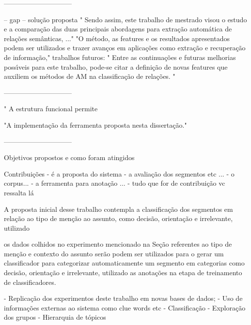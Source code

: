 ------------------------------

-- gap
-- solução proposta
	" Sendo assim, este trabalho de mestrado visou o estudo e a comparação das duas principais abordagens para extração automática de relações semânticas, ..."
	"O método, as features e os resultados apresentados podem ser utilizados e trazer avanços em aplicações como extração e recuperação de informação,"
trabalhos futuros:
	" Entre as continuações e futuras melhorias possı́veis para este trabalho, pode-se citar a definição de novas features que auxiliem os métodos de AM na classificação de relações. "


------------------------------



" A estrutura funcional permite

"A implementação da ferramenta proposta nesta dissertação."



------------------------------



Objetivos propostos e como foram atingidos





Contribuições	
	- é a proposta do sistema 
	- a avaliação dos segmentos etc ... 
	- o corpus... 
	- a ferramenta para anotação ... 
	- tudo que for de contribuição vc ressalta lá 




	A proposta inicial desse trabalho contempla a classificação dos segmentos em relação ao tipo de menção ao assunto, como decisão, orientação e irrelevante, utilizado 

	os dados colhidos no experimento mencionado na Seção referentes ao tipo de menção e contexto do assunto serão podem ser utilizados para o gerar um classificador para categorizar automaticamente um segmento em categorias como decisão, orientação e irrelevante, utilizado as anotações na etapa de treinamento de classificadores.




	- Replicação dos experimentos deste trabalho em novas bases de dados;
	- Uso de informações externas ao sistema como clue words etc
	- Classificação
	- Exploração dos grupos
	- Hierarquia de tópicos



